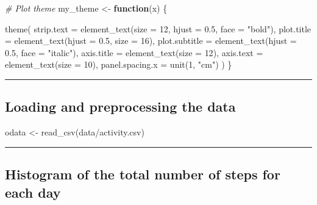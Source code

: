 \documentclass[
  paper=a4,
  ,captions=tableheading
]{scrartcl}
\newenvironment{Shaded}{\begin{snugshade}}{\end{snugshade}}
\newcommand{\AttributeTok}[1]{\textcolor[rgb]{0.77,0.63,0.00}{#1}}
\newcommand{\CommentTok}[1]{\textcolor[rgb]{0.56,0.35,0.01}{\textit{#1}}}
\newcommand{\ControlFlowTok}[1]{\textcolor[rgb]{0.13,0.29,0.53}{\textbf{#1}}}
\newcommand{\DecValTok}[1]{\textcolor[rgb]{0.00,0.00,0.81}{#1}}
\newcommand{\FloatTok}[1]{\textcolor[rgb]{0.00,0.00,0.81}{#1}}
\newcommand{\FunctionTok}[1]{\textcolor[rgb]{0.00,0.00,0.00}{#1}}
\newcommand{\NormalTok}[1]{#1}
\newcommand{\OtherTok}[1]{\textcolor[rgb]{0.56,0.35,0.01}{#1}}
\newcommand{\StringTok}[1]{\textcolor[rgb]{0.31,0.60,0.02}{#1}}
\begin{document}
\begin{Shaded}
\begin{Highlighting}[]
\CommentTok{\# Plot theme}
\NormalTok{my\_theme }\OtherTok{\textless{}{-}} \ControlFlowTok{function}\NormalTok{(x) \{}
  
    \FunctionTok{theme}\NormalTok{(}
    \AttributeTok{strip.text =} \FunctionTok{element\_text}\NormalTok{(}\AttributeTok{size =} \DecValTok{12}\NormalTok{, }\AttributeTok{hjust =} \FloatTok{0.5}\NormalTok{, }\AttributeTok{face =} \StringTok{"bold"}\NormalTok{),}
    \AttributeTok{plot.title =} \FunctionTok{element\_text}\NormalTok{(}\AttributeTok{hjust =} \FloatTok{0.5}\NormalTok{, }\AttributeTok{size =} \DecValTok{16}\NormalTok{),}
    \AttributeTok{plot.subtitle =} \FunctionTok{element\_text}\NormalTok{(}\AttributeTok{hjust =} \FloatTok{0.5}\NormalTok{, }\AttributeTok{face =} \StringTok{"italic"}\NormalTok{),}
    \AttributeTok{axis.title =} \FunctionTok{element\_text}\NormalTok{(}\AttributeTok{size =} \DecValTok{12}\NormalTok{),}
    \AttributeTok{axis.text =} \FunctionTok{element\_text}\NormalTok{(}\AttributeTok{size =} \DecValTok{10}\NormalTok{),}
    \AttributeTok{panel.spacing.x =} \FunctionTok{unit}\NormalTok{(}\DecValTok{1}\NormalTok{, }\StringTok{"cm"}\NormalTok{)}
\NormalTok{  )}
\NormalTok{\}}
\end{Highlighting}
\end{Shaded}

\begin{center}\rule{0.5\linewidth}{0.5pt}\end{center}

\hypertarget{loading-and-preprocessing-the-data}{%
\subsection{Loading and preprocessing the
data}\label{loading-and-preprocessing-the-data}}

\begin{Shaded}
\begin{Highlighting}[]
\NormalTok{odata }\OtherTok{\textless{}{-}} \FunctionTok{read\_csv}\NormalTok{(}\StringTok{\textquotesingle{}data/activity.csv\textquotesingle{}}\NormalTok{)}
\end{Highlighting}
\end{Shaded}

\begin{center}\rule{0.5\linewidth}{0.5pt}\end{center}

\hypertarget{histogram-of-the-total-number-of-steps-for-each-day}{%
\subsection{Histogram of the total number of steps for each
day}\label{histogram-of-the-total-number-of-steps-for-each-day}}
\end{document}
